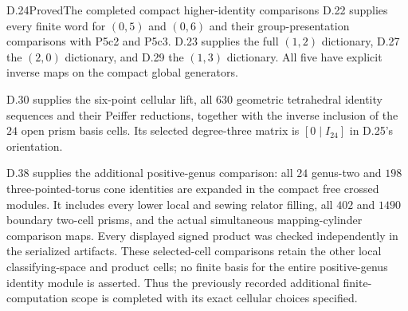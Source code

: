 \begin{result}{D.24}{Proved}{The completed compact higher-identity comparisons}
D.22 supplies every finite word for $(0,5)$ and $(0,6)$
and their group-presentation comparisons with P5c2 and P5c3.
D.23 supplies the full $(1,2)$ dictionary, D.27 the $(2,0)$
dictionary, and D.29 the $(1,3)$ dictionary.  All five
have explicit inverse maps on the compact global generators.

D.30 supplies the six-point cellular lift, all $630$
geometric tetrahedral identity sequences and their Peiffer
reductions, together with the inverse inclusion of the
$24$ open prism basis cells.  Its selected degree-three
matrix is $[0\mid I_{24}]$ in D.25's orientation.

D.38 supplies the additional positive-genus comparison:
all $24$ genus-two and $198$ three-pointed-torus cone
identities are expanded in the compact free crossed modules.
It includes every lower local and sewing relator filling,
all $402$ and $1490$ boundary two-cell prisms, and the
actual simultaneous mapping-cylinder comparison maps.
Every displayed signed product was checked independently
in the serialized artifacts.  These selected-cell
comparisons retain the other local classifying-space and
product cells; no finite basis for the entire positive-genus
identity module is asserted.  Thus the previously recorded
additional finite-computation scope is completed with its
exact cellular choices specified.
\end{result}

